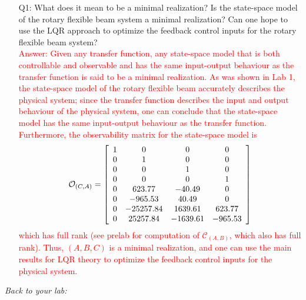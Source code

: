 \documentclass[12pt]{report}
\newcommand\drew[1]{\textcolor{red}{#1}}
\begin{document}
\begin{enumerate}[Question]
    \item[Q1:] What does it mean to be a minimal realization? Is the state-space model of the rotary flexible beam system a minimal realization? Can one hope to use the LQR approach to optimize the feedback control inputs for the rotary flexible beam system?\\
          \drew{Answer: Given any transfer function, any state-space model that is both controllable and observable and has the same input-output behaviour as the transfer function is said to be a minimal realization. As was shown in Lab 1, the state-space model of the rotary flexible beam accurately describes the physical system; since the transfer function describes the input and output behaviour of the physical system, one can conclude that the state-space model has the same input-output behaviour as the transfer function. Furthermore, the observability matrix for the state-space model is
              \[
                  \mathcal{O}_{(C,A)} = \left[\begin{array}{c c c c}
                          1 & 0         & 0        & 0       \\
                          0 & 1         & 0        & 0       \\
                          0 & 0         & 1        & 0       \\
                          0 & 0         & 0        & 1       \\
                          0 & 623.77    & -40.49   & 0       \\
                          0 & -965.53   & 40.49    & 0       \\
                          0 & -25257.84 & 1639.61  & 623.77  \\
                          0 & 25257.84  & -1639.61 & -965.53
                      \end{array}\right]
              \]
              which has full rank (see prelab for computation of $\mathcal{C}_{(A,B)}$, which also has full rank). Thus, $(A,B,C)$ is a minimal realization, and one can use the main results for LQR theory to optimize the feedback control inputs for the physical system.
          }
\end{enumerate}

\noindent \emph{Back to your lab:}
\end{document}
